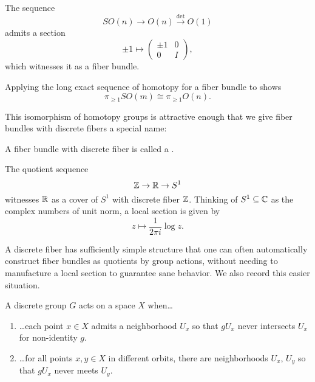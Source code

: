 \begin{example}\label{SOtoOisAFiberBundle}%
The sequence \[SO(n) \to O(n) \xrightarrow{\det} O(1)\] admits a section \[\pm 1 \mapsto \left( \begin{array}{c|c} \pm 1 & 0 \\ \hline 0 & I \end{array} \right),\] which witnesses it as a fiber bundle.
\end{example}

\begin{example}
Applying the long exact sequence of homotopy for a fiber bundle to  shows \[\pi_{\ge 1} SO(m) \cong \pi_{\ge 1} O(n).\]
\end{example}

\noindent
This isomorphism of homotopy groups is attractive enough that we give fiber bundles with discrete fibers a special name:

\begin{definition}
A fiber bundle with discrete fiber is called a .
\end{definition}

\begin{example}
The quotient sequence \[\mathbb Z \to \mathbb R \to S^1\] witnesses $\mathbb R$ as a cover of $S^1$ with discrete fiber $\mathbb Z$.
Thinking of $S^1 \subseteq \mathbb C$ as the complex numbers of unit norm, a local section is given by \[z \mapsto \frac{1}{2 \pi i} \log z.\]
\end{example}

A discrete fiber has sufficiently simple structure that one can often automatically construct fiber bundles as quotients by group actions, without needing to manufacture a local section to guarantee sane behavior.
We also record this easier situation.

\begin{definition}
A discrete group $G$ acts  on a space $X$ when\ldots
\begin{enumerate}
    \item \ldots each point $x \in X$ admits a neighborhood $U_x$ so that $g U_x$ never intersects $U_x$ for non-identity $g$.\label{PropDiscon1}
    \item \ldots for all points $x, y \in X$ in different orbits, there are neighborhoods $U_x$, $U_y$ so that $gU_x$ never meets $U_y$.\label{PropDiscon2}
\end{enumerate}
\end{definition}


